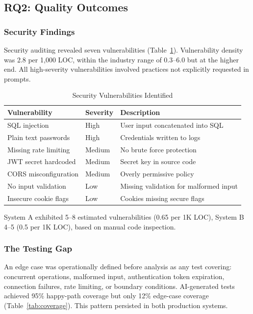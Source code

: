\documentclass[sigconf]{acmart}
\begin{document}
\subsection{RQ2: Quality Outcomes}

\subsubsection{Security Findings}

Security auditing revealed seven vulnerabilities (Table~\ref{tab:vulnerabilities}). Vulnerability density was 2.8 per 1,000 LOC, within the industry range of 0.3–6.0 but at the higher end. All high-severity vulnerabilities involved practices not explicitly requested in prompts.

\begin{table}[htbp]
\caption{Security Vulnerabilities Identified}
\label{tab:vulnerabilities}
\centering
\small
\begin{tabular}{@{}p{}p{}p{}@{}}
\toprule
\textbf{Vulnerability} & \textbf{Severity} & \textbf{Description} \\
\midrule
SQL injection & High & User input concatenated into SQL \\
Plain text passwords & High & Credentials written to logs \\
Missing rate limiting & Medium & No brute force protection \\
JWT secret hardcoded & Medium & Secret key in source code \\
CORS misconfiguration & Medium & Overly permissive policy \\
No input validation & Low & Missing validation for malformed input \\
Insecure cookie flags & Low & Cookies missing secure flags \\
\bottomrule
\end{tabular}
\end{table}

System A exhibited 5–8 estimated vulnerabilities (0.65 per 1K LOC), System B 4–5 (0.5 per 1K LOC), based on manual code inspection.

\subsubsection{The Testing Gap}

An edge case was operationally defined before analysis as any test covering: concurrent operations, malformed input, authentication token expiration, connection failures, rate limiting, or boundary conditions. AI-generated tests achieved 95\% happy-path coverage but only 12\% edge-case coverage (Table~\ref{tab:coverage}). This pattern persisted in both production systems.
\end{document}
